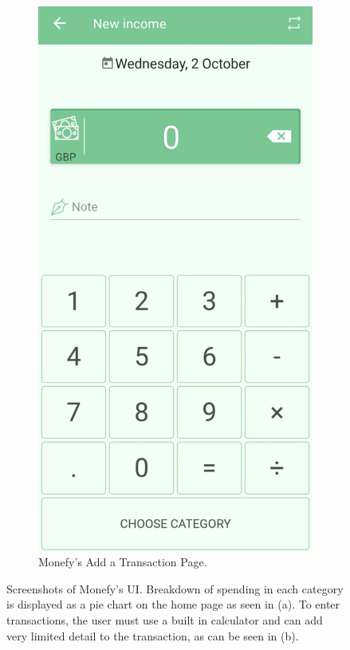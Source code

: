 \documentclass{l4proj}
\begin{document}
\begin{appendices}
\begin{figure}[h]
    \hspace{0.5cm}
    \begin{subfigure}[t]{0.25\textwidth}
        \vspace{0pt}
        \includegraphics[width=\textwidth]{images/App-Comparison/monefy-ss-2.png} 
        \caption{Monefy's Add a Transaction Page.}
        \label{fig:syn2}
    \end{subfigure}
    \caption{Screenshots of Monefy's UI. Breakdown of spending in each category is displayed as a pie chart on the home page as seen in (a). To enter transactions, the user must use a built in calculator and can add very limited detail to the transaction, as can be seen in (b).}
    \label{fig:synthetic}
\end{figure}


\end{appendices}
\end{document}
